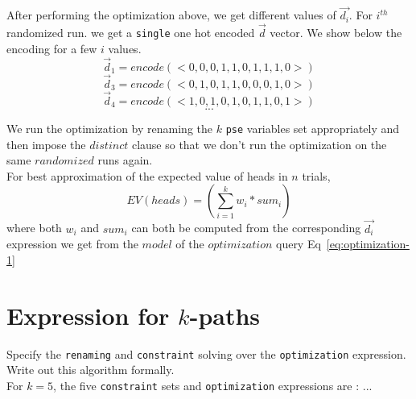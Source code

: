 \documentclass[usenames,dvipsnames,acmsmall]{acmart}
\begin{document}
After performing the optimization above, we get different values of $\vec{d_i}$. For $i^{th}$ randomized run. we get a \texttt{single} one hot encoded \texttt{$\vec{d}$} vector. We show below the encoding for a few $i$ values. 
\[
\vec{d}_{1} = encode(<0,0,0,1,1,0,1,1,1,0>)
\]
\[
\vec{d}_{3} = encode(<0,1,0,1,1,0,0,0,1,0>)
\]
\[
\vec{d}_{4} = encode(<1,0,1,0,1,0,1,1,0,1>)
\]
\[
...
\]

We run the optimization by renaming the $k$ \texttt{pse} variables set appropriately and then impose the $distinct$ clause so that we don't run the optimization on the same $randomized$ runs again. \\

For best approximation of the expected value of heads in $n$ trials,
\begin{equation}	
	EV(heads) = (\sum_{i=1}^{k}{w_i * sum_i})
\end{equation}
where both $w_i$ and $sum_i$ can both be computed from the corresponding $\vec{d_i}$ expression we get from the $model$  of the $optimization$ query Eq~\ref{eq:optimization-1}

\section{Expression for $k$-paths}

Specify the \texttt{renaming} and \texttt{constraint} solving over the \texttt{optimization} expression. Write out this algorithm formally. \\ 

For $k = 5$, the five \texttt{constraint} sets and \texttt{optimization} expressions are : ...
\end{document}
